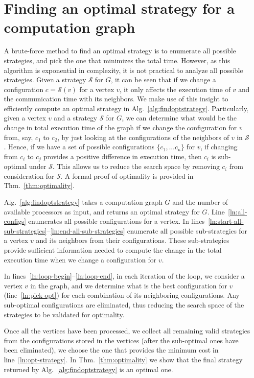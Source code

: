 \documentclass{article}
\newcommand{\strategy}{\mathcal{S}}
\newcommand{\set}[1]{\{#1\}}
\begin{document}
\section{Finding an optimal strategy for a computation graph}
A brute-force method to find an optimal strategy is to enumerate all possible
strategies, and pick the one that minimizes the total time. However, as this
algorithm is exponential in complexity, it is not practical to analyze all
possible strategies. Given a strategy $\strategy$ for $G$, it can be seen that
if we change a configuration $c=\strategy(v)$ for a vertex $v$, it only affects
the execution time of $v$ and the communication time with its neighbors. We make
use of this insight to efficiently compute an optimal strategy in
Alg.~\ref{alg:findoptstrategy}. Particularly, given a vertex $v$ and a
strategy $\strategy$ for $G$, we can determine what would be the change in total
execution time of the graph if we change the configuration for $v$ from, say,
$c_1$ to $c_2$, by just looking at the configurations of the neighbors of $v$ in
$\strategy$. Hence, if we have a set of possible configurations $\set{c_1, \dots
c_n}$ for $v$, if changing from $c_i$ to $c_j$ provides a positive difference
in execution time, then $c_i$ is sub-optimal under $\strategy$. This allows us
to reduce the search space by removing $c_i$ from consideration for $\strategy$.
A formal proof of optimality is provided in Thm.~\ref{thm:optimality}.

Alg.~\ref{alg:findoptstrategy} takes a computation graph $G$ and the number of
available processors as input, and returns an optimal strategy for $G$.
Line~\ref{ln:all-configs} enumerates all possible configurations for a vertex.
In lines~\ref{ln:start-all-sub-strategies}--\ref{ln:end-all-sub-strategies}
enumerate all possible sub-strategies for a vertex $v$ and its neighbors from
their configurations. These sub-strategies provide sufficient information needed
to compute the change in the total execution time when we change a configuration
for $v$.

In lines~\ref{ln:loop-begin}--\ref{ln:loop-end}, in each iteration of the loop,
we consider a vertex $v$ in the graph, and we determine what is the best
configuration for $v$ (line~\ref{ln:pick-opt}) for each combination of its
neighboring configurations. Any sub-optimal configurations are eliminated, thus
reducing the search space of the strategies to be validated for optimality.

Once all the vertices have been processed, we collect all remaining valid
strategies from the configurations stored in the vertices (after the sub-optimal
ones have been eliminated), we choose the one that provides the minimum cost in
line~\ref{ln:opt-strategy}. In Thm.~\ref{thm:optimality} we show that the final
strategy returned by Alg.~\ref{alg:findoptstrategy} is an optimal one.
\end{document}
